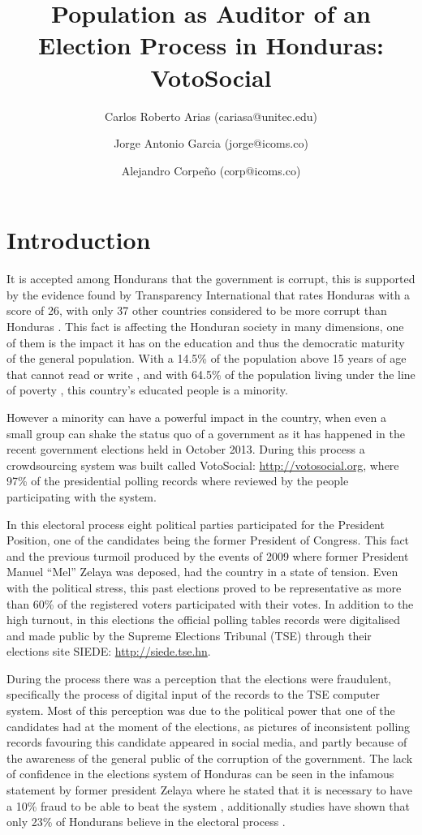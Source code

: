 \documentclass[letterpaper,10pt]{article}
\title{Population as Auditor of an Election Process in Honduras: VotoSocial}
\author[1,2]{Carlos Roberto Arias (cariasa@unitec.edu)}
\author[1,3]{Jorge Antonio Garcia (jorge@icoms.co)}
\author[3]{Alejandro Corpeño (corp@icoms.co)}
\affil[1]{Facultad de Ingenier\'{i}a, UNITEC, Tegucigalpa, Honduras}
\affil[2]{Instituto de Investigaci\'{o}n de Pol\'{i}ticas P\'{u}blicas, UNITEC, Tegucigalpa, Honduras}
\affil[3]{Icoms Technologies S de RL, Tegucigalpa, Honduras}
\begin{document}
\maketitle

\begin{abstract}

\end{abstract}

\section{Introduction}
It is accepted among Hondurans that the government is corrupt, this is supported by the evidence found by Transparency International that rates Honduras with a score of 26, with only 37 other countries considered to be more corrupt than Honduras \citep{transp}. This fact is affecting the Honduran society in many dimensions, one of them is the impact it has on the education and thus the democratic maturity of the general population. With a 14.5\% of the population above 15 years of age that cannot read or write \citep{bchrep}, and with 64.5\% of the population living under the line of poverty \citep{wbdata}, this country's educated people is a minority.


However a minority can have a powerful impact in the country, when even a small group can shake the status quo of a government \citep{saadia2014} as it has happened in the recent government elections held in October 2013. During this process a crowdsourcing system was built called VotoSocial: \url{http://votosocial.org}, where 97\% of the presidential polling records where reviewed by the people participating with the system.

In this electoral process eight political parties participated for the President Position, one of the candidates being the former President of Congress. This fact and the previous turmoil produced by the events of 2009 where former President Manuel “Mel” Zelaya was deposed, had the country in a state of tension. Even with the political stress, this past elections proved to be representative as more than 60\% of the registered voters participated with their votes. In addition to the high turnout, in this elections the official polling tables records were digitalised and made public by the Supreme Elections Tribunal (TSE) through their elections site SIEDE: \url{http://siede.tse.hn}.

During the process there was a perception that the elections were fraudulent, specifically the process of digital input of the records to the TSE computer system. Most of this perception was due to the political power that one of the candidates had at the moment of the elections, as pictures of inconsistent polling records favouring this candidate appeared in social media, and partly because of the awareness of the general public of the corruption of the government. The lack of confidence in the elections system of Honduras can be seen in the infamous statement by former president Zelaya where he stated that it is necessary to have a 10\% fraud to be able to beat the system \citep{melvid}, additionally studies have shown that only 23\% of Hondurans believe in the electoral process \citep{romero2014}.
\end{document}

